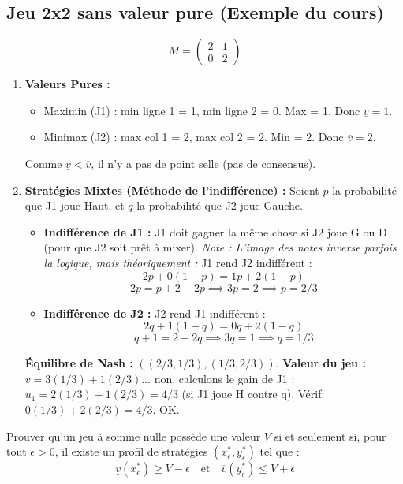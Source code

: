 \subsection{Jeu 2x2 sans valeur pure (Exemple du cours)}
$$M = \begin{pmatrix} 2 & 1 \\ 0 & 2 \end{pmatrix}$$
\begin{enumerate}
    \item \textbf{Valeurs Pures :}
    \begin{itemize}
        \item Maximin (J1) : min ligne 1 = 1, min ligne 2 = 0. Max = 1. Donc $\underline{v} = 1$.
        \item Minimax (J2) : max col 1 = 2, max col 2 = 2. Min = 2. Donc $\overline{v} = 2$.
    \end{itemize}
    Comme $\underline{v} < \overline{v}$, il n'y a pas de point selle (pas de consensus).

    \item \textbf{Stratégies Mixtes (Méthode de l'indifférence) :}
    Soient $p$ la probabilité que J1 joue Haut, et $q$ la probabilité que J2 joue Gauche.
    \begin{itemize}
        \item \textbf{Indifférence de J1 :} J1 doit gagner la même chose si J2 joue G ou D (pour que J2 soit prêt à mixer).
         \textit{Note : L'image des notes inverse parfois la logique, mais théoriquement :}
         J1 rend J2 indifférent :
         $$2p + 0(1-p) = 1p + 2(1-p)$$
         $$2p = p + 2 - 2p \implies 3p = 2 \implies p = 2/3$$
        
        \item \textbf{Indifférence de J2 :} J2 rend J1 indifférent :
        $$2q + 1(1-q) = 0q + 2(1-q)$$
        $$q + 1 = 2 - 2q \implies 3q = 1 \implies q = 1/3$$
    \end{itemize}
    \textbf{Équilibre de Nash :} $((2/3, 1/3), (1/3, 2/3))$.
    \textbf{Valeur du jeu :} $v = 3(1/3) + 1(2/3) \dots$ non, calculons le gain de J1 :
    $u_1 = 2(1/3) + 1(2/3) = 4/3$ (si J1 joue H contre q).
    Vérif: $0(1/3) + 2(2/3) = 4/3$. OK.
\end{enumerate}

\begin{exercice}
Prouver qu'un jeu à somme nulle possède une valeur $V$ si et seulement si, pour tout $\epsilon > 0$, il existe un profil de stratégies $(x^*_\epsilon, y^*_\epsilon)$ tel que :
$$ \underline{v}(x^*_\epsilon) \ge V - \epsilon \quad \text{et} \quad \overline{v}(y^*_\epsilon) \le V + \epsilon $$
\end{exercice}

